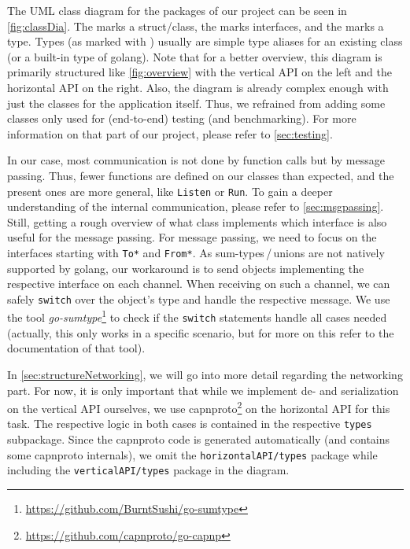 \documentclass[a4paper,english,10pt,NET]{tumarticle}
\begin{document}
The UML class diagram for the packages of our project can be seen in \cref{fig:classDia}.
The  marks a struct/class,
the  marks interfaces, and
the  marks a type.
Types (as marked with ) usually are simple type aliases for an existing class (or a built-in type of golang).
Note that for a better overview, this diagram is primarily structured like \cref{fig:overview} with the vertical API on the left and the horizontal API on the right.
Also, the diagram is already complex enough with just the classes for the application itself.
Thus, we refrained from adding some classes only used for (end-to-end) testing (and benchmarking).
For more information on that part of our project, please refer to \cref{sec:testing}.

In our case, most communication is not done by function calls but by message passing.
Thus, fewer functions are defined on our classes than expected, and the present ones are more general, like \lstinline{Listen} or \lstinline{Run}.
To gain a deeper understanding of the internal communication, please refer to \cref{sec:msgpassing}.
Still, getting a rough overview of what class implements which interface is also useful for the message passing. \label{sumtypes}
For message passing, we need to focus on the interfaces starting with \texttt{To*} and \texttt{From*}.
As sum-types\,/\,unions are not natively supported by golang, our workaround is to send objects implementing the respective interface on each channel.
When receiving on such a channel, we can safely \texttt{switch} over the object's type and handle the respective message.
We use the tool \emph{go-sumtype}\footnote{\url{https://github.com/BurntSushi/go-sumtype}} to check if the \texttt{switch} statements handle all cases needed (actually, this only works in a specific scenario, but for more on this refer to the documentation of that tool).

In \cref{sec:structureNetworking}, we will go into more detail regarding the networking part.
For now, it is only important that while we implement de- and serialization on the vertical API ourselves, we use capnproto\footnote{\url{https://github.com/capnproto/go-capnp}} on the horizontal API for this task.
The respective logic in both cases is contained in the respective \texttt{types} subpackage.
Since the capnproto code is generated automatically (and contains some capnproto internals), we omit the \texttt{horizontalAPI/types} package while including the \texttt{verticalAPI/types} package in the diagram.
\end{document}
